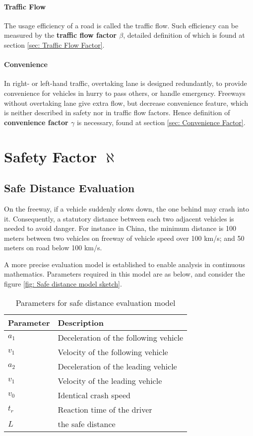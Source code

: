 \paragraph{Traffic Flow} The usage efficiency of a road is 
called the traffic flow. Such efficiency can be measured 
by the \textbf{traffic flow factor $\beta$}, detailed 
definition of which is found at section \ref{sec: Traffic 
Flow Factor}.

\paragraph{Convenience} In right- or left-hand traffic, 
overtaking lane is designed redundantly, to provide 
convenience for vehicles in hurry to pass others, or handle 
emergency. Freeways without overtaking lane give extra flow, 
but decrease convenience feature, which is neither described 
in safety nor in traffic flow factors. Hence definition of 
\textbf{convenience factor $\gamma$} is necessary, found at  
section \ref{sec: Convenience Factor}.


\section{Safety Factor $ \aleph $}
\label{sec: Safety Factor}

\subsection{Safe Distance Evaluation}
\label{sec: Safe Distance Evaluation}

On the freeway, if a vehicle suddenly slows down, the one 
behind may crash into it. Consequently, a statutory 
distance between each two adjacent vehicles is needed to 
avoid danger. For instance in China, the minimum distance 
is 100 meters between two vehicles on freeway of vehicle 
speed over 100 km/s; and 50 meters on road below 100 km/s.
\cite{PRC_State_Council_Decree_405}

A more precise evaluation model is established to enable 
analysis in continuous mathematics. Parameters required 
in this model are as below, and consider the figure 
\ref{fig: Safe distance model sketch}.

\begin{table}
\centering
\begin{tabular}{ll}
\hline
Parameter & Description\\
\hline
$a_1$ & Deceleration of the following vehicle \\
$v_1$ & Velocity of the following vehicle \\
$a_2$ & Deceleration of the leading vehicle \\
$v_1$ & Velocity of the leading vehicle \\
$v_0$ & Identical crash speed \\
$t_r$ & Reaction time of the driver \\
$L$   & the safe distance \\
\hline
\end{tabular}
\caption{Parameters for safe distance evaluation model}
\end{table}

